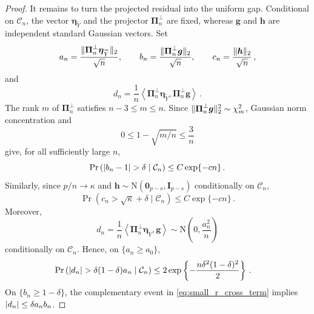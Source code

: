 \documentclass{article}
\makeatletter
\theoremstyle{definition}
\newcommand{\vnorm}[1]{%
	\ensuremath{%
		\if@display
		\left\| #1 \right\|
		\else
		\| #1 \|
		\fi
	}%
}
\newcommand{\abs}[1]{%
	\ensuremath{%
		\if@display
		\left| #1 \right|
		\else
		\lvert #1 \rvert
		\fi
	}%
}
\newcommand*{\bb}{\boldsymbol}
\def\bh{\bb{h}}
\def\bg{\bb{g}}
\def\Ytil{\widetilde{Y}}
\def\bEtaYtil{\bb{\eta}_{\Ytil}}
\makeatother
\begin{document}
\begin{bibunit}
\begin{proof}
It remains to turn the projected residual into the uniform gap. Conditional
on $\mathcal C_n$, the vector $\bEtaYtil$ and the projector
$\bb\Pi_n^\perp$ are fixed, whereas $\bg$ and $\bh$ are independent
standard Gaussian vectors. Set
$$
	a_n
	=
	\frac{\vnorm{\bb\Pi_n^\perp\bEtaYtil}_2}{\sqrt n},
	\qquad
	b_n
	=
	\frac{\vnorm{\bb\Pi_n^\perp\bg}_2}{\sqrt n},
	\qquad
	c_n
	=
	\frac{\vnorm{\bh}_2}{\sqrt n}\,,
$$
and
$$
	d_n
	=
	\frac1n
	\left\langle
		\bb\Pi_n^\perp\bEtaYtil,
		\bb\Pi_n^\perp\bg
	\right\rangle\,.
$$
The rank $m$ of $\bb\Pi_n^\perp$ satisfies $n-3\leq m\leq n$. Since
$\vnorm{\bb\Pi_n^\perp\bg}_2^2\sim\chi_m^2$, Gaussian norm
concentration \citep[Theorem~3.1.1]{vershynin:2018} and
$$
	0
	\leq
	1-\sqrt{m/n}
	\leq
	\frac3n
$$
give, for all sufficiently large $n$,
\begin{equation}
\label{eq:small_r_projected_gaussian_norm}
	\Pr\left(
		\abs{b_n-1}>\delta
		\mid
		\mathcal C_n
	\right)
	\leq
	C\exp\{-cn\}\,.
\end{equation}
Similarly, since $p/n\to\kappa$ and
$\bh\sim\mathrm N(\bb0_{p-s},\bb I_{p-s})$ conditionally on
$\mathcal C_n$,
\begin{equation}
\label{eq:small_r_h_norm}
	\Pr\left(
		c_n>\sqrt\kappa+\delta
		\mid
		\mathcal C_n
	\right)
	\leq
	C\exp\{-cn\}\,.
\end{equation}
Moreover,
$$
	d_n
	=
	\frac1n
	\left\langle
		\bb\Pi_n^\perp\bEtaYtil,
		\bg
	\right\rangle
	\sim
	\mathrm N\left(
		0,
		\frac{a_n^2}{n}
	\right)
$$
conditionally on $\mathcal C_n$. Hence, on $\{a_n\geq a_0\}$,
\begin{equation}
\label{eq:small_r_cross_term}
\begin{aligned}
	\Pr\left(
		\abs{d_n}>\delta(1-\delta)a_n
		\mid
		\mathcal C_n
	\right)
	&\leq
	2\exp\left\{
		-\frac{n\delta^2(1-\delta)^2}{2}
	\right\}\,.
\end{aligned}
\end{equation}
On $\{b_n\geq1-\delta\}$, the complementary event in
\eqref{eq:small_r_cross_term} implies
$\abs{d_n}\leq\delta a_nb_n$.


\end{proof}
\end{bibunit}
\end{document}

